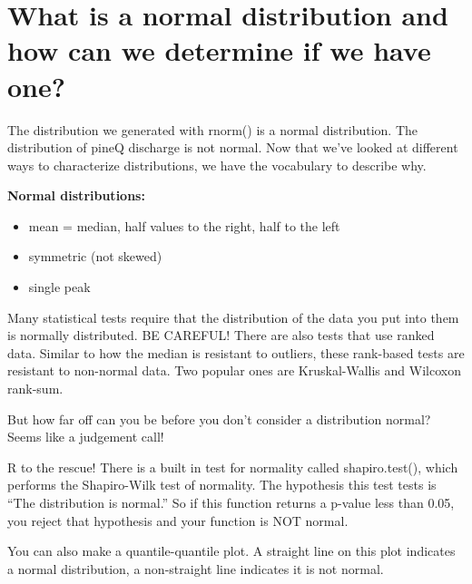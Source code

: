\documentclass[
]{book}
\newenvironment{Shaded}{\begin{snugshade}}{\end{snugshade}}
\newcommand{\FunctionTok}[1]{\textcolor[rgb]{0.00,0.00,0.00}{#1}}
\newcommand{\NormalTok}[1]{#1}
\newcommand{\SpecialCharTok}[1]{\textcolor[rgb]{0.00,0.00,0.00}{#1}}
\providecommand{\tightlist}{%
  \setlength{\itemsep}{0pt}\setlength{\parskip}{0pt}}
\begin{document}
\hypertarget{what-is-a-normal-distribution-and-how-can-we-determine-if-we-have-one}{%
\section{What is a normal distribution and how can we determine if we have one?}\label{what-is-a-normal-distribution-and-how-can-we-determine-if-we-have-one}}

The distribution we generated with rnorm() is a normal distribution. The distribution of pineQ discharge is not normal. Now that we've looked at different ways to characterize distributions, we have the vocabulary to describe why.

\textbf{Normal distributions:}

\begin{itemize}
\tightlist
\item
  mean = median, half values to the right, half to the left
\item
  symmetric (not skewed)
\item
  single peak
\end{itemize}

Many statistical tests require that the distribution of the data you put into them is normally distributed. BE CAREFUL! There are also tests that use ranked data. Similar to how the median is resistant to outliers, these rank-based tests are resistant to non-normal data. Two popular ones are Kruskal-Wallis and Wilcoxon rank-sum.

But how far off can you be before you don't consider a distribution normal? Seems like a judgement call!

R to the rescue! There is a built in test for normality called shapiro.test(), which performs the Shapiro-Wilk test of normality. The hypothesis this test tests is ``The distribution is normal.'' So if this function returns a p-value less than 0.05, you reject that hypothesis and your function is NOT normal.

You can also make a quantile-quantile plot. A straight line on this plot indicates a normal distribution, a non-straight line indicates it is not normal.

\begin{Shaded}
\end{Shaded}
\end{document}
